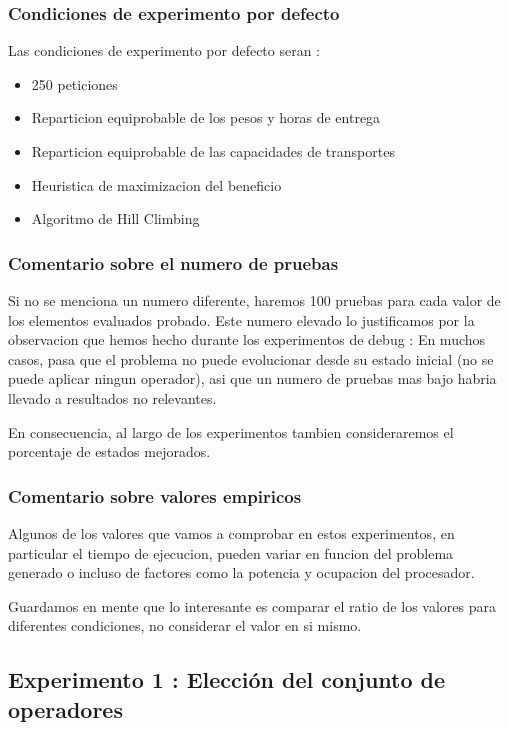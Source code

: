 \documentclass{article}
\begin{document}
\subsubsection{Condiciones de experimento por defecto}

Las condiciones de experimento por defecto seran :
\begin{itemize}
\item 250 peticiones
\item Reparticion equiprobable de los pesos y horas de entrega
\item Reparticion equiprobable de las capacidades de transportes
\item Heuristica de maximizacion del beneficio
\item Algoritmo de Hill Climbing
\end{itemize}

\subsubsection{Comentario sobre el numero de pruebas}

Si no se menciona un numero diferente, haremos 100 pruebas para cada valor de
los elementos evaluados probado. Este numero elevado lo justificamos por la
observacion que hemos hecho durante los experimentos de debug : En muchos casos,
pasa que el problema no puede evolucionar desde su estado inicial (no se puede
aplicar ningun operador), asi que un numero de pruebas mas bajo habria llevado a
resultados no relevantes.

En consecuencia, al largo de los experimentos tambien consideraremos el
porcentaje de estados mejorados.

\subsubsection{Comentario sobre valores empiricos}

Algunos de los valores que vamos a comprobar en estos experimentos, en
particular el tiempo de ejecucion, pueden variar en funcion del problema
generado o incluso de factores como la potencia y ocupacion del procesador.

Guardamos en mente que lo interesante es comparar el ratio de los valores para
diferentes condiciones, no considerar el valor en si mismo.

\subsection{Experimento 1 : Elección del conjunto de operadores}
\end{document}
